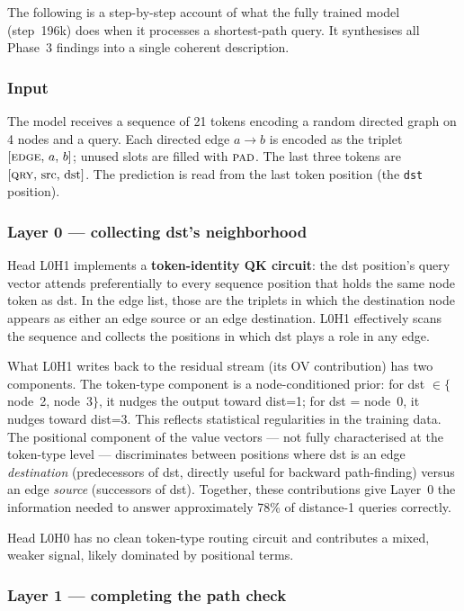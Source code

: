 \documentclass[11pt, a4paper]{article}
\begin{document}
The following is a step-by-step account of what the fully trained model
(step~196k) does when it processes a shortest-path query.  It synthesises
all Phase~3 findings into a single coherent description.

\subsubsection*{Input}

The model receives a sequence of 21 tokens encoding a random directed graph
on 4 nodes and a query.  Each directed edge $a \to b$ is encoded as the
triplet $[\textsc{edge},\, a,\, b]$; unused slots are filled with
$\textsc{pad}$.  The last three tokens are $[\textsc{qry},\, \text{src},\,
\text{dst}]$.  The prediction is read from the last token position (the
\texttt{dst} position).

\subsubsection*{Layer 0 --- collecting dst's neighborhood}

Head L0H1 implements a \textbf{token-identity QK circuit}: the dst position's
query vector attends preferentially to every sequence position that holds the
same node token as dst.  In the edge list, those are the triplets in which
the destination node appears as either an edge source or an edge destination.
L0H1 effectively scans the sequence and collects the positions in which dst
plays a role in any edge.

What L0H1 writes back to the residual stream (its OV contribution) has two
components.  The token-type component is a node-conditioned prior: for dst
$\in \{$node~2, node~3$\}$, it nudges the output toward dist=1; for dst =
node~0, it nudges toward dist=3.  This reflects statistical regularities in
the training data.  The positional component of the value vectors --- not
fully characterised at the token-type level --- discriminates between
positions where dst is an edge \emph{destination} (predecessors of dst,
directly useful for backward path-finding) versus an edge \emph{source}
(successors of dst).  Together, these contributions give Layer~0 the
information needed to answer approximately 78\% of distance-1 queries
correctly.

Head L0H0 has no clean token-type routing circuit and contributes a mixed,
weaker signal, likely dominated by positional terms.

\subsubsection*{Layer 1 --- completing the path check}
\end{document}
